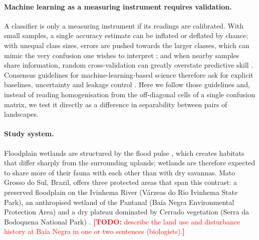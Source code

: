 \documentclass[10pt,a4paper,twocolumn]{article}
\newif\ifshowtodos \showtodostrue
\newcommand{\TODO}[1]{\ifshowtodos\textcolor{red}{\textbf{[TODO:} #1\textbf{]}}\fi}
\begin{document}
\paragraph{Machine learning as a measuring instrument requires validation.}
A classifier is only a measuring instrument if its readings are calibrated. With small samples, a
single accuracy estimate can be inflated or deflated by chance; with unequal class sizes, errors are
pushed towards the larger classes, which can mimic the very confusion one wishes to interpret
\citep{chen2004,valavi2021}; and when nearby samples share information, random cross-validation can
greatly overstate predictive skill \citep{roberts2017,ploton2020}. Consensus guidelines for
machine-learning-based science therefore ask for explicit baselines, uncertainty and leakage control
\citep{kapoor2024,walsh2021}. Here we follow those guidelines and, instead of reading homogenisation
from the off-diagonal cells of a single confusion matrix, we test it directly as a difference in
separability between pairs of landscapes.

\paragraph{Study system.}
Floodplain wetlands are structured by the flood pulse \citep{junk1989}, which creates habitats
that differ sharply from the surrounding uplands; wetlands are therefore expected to share more of
their fauna with each other than with dry savannas. Mato Grosso do Sul, Brazil, offers three
protected areas that span this contrast: a preserved floodplain on the Ivinhema River (Várzeas do Rio
Ivinhema State Park), an anthropised wetland of the Pantanal (Baía Negra Environmental Protection
Area) and a dry plateau dominated by Cerrado vegetation (Serra da Bodoquena National Park)
\citep{leite_companion}. \TODO{describe the land use and disturbance history at Baía Negra in one or
two sentences (biologists).}
\end{document}
